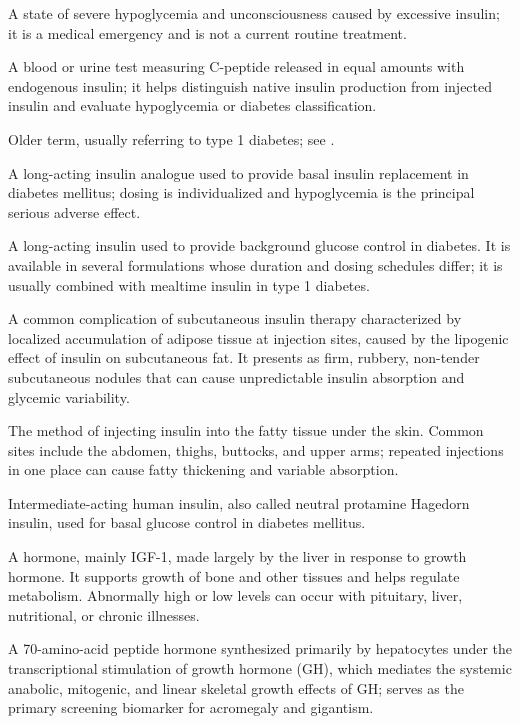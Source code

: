  A state of severe hypoglycemia and unconsciousness caused by excessive insulin; it is a medical emergency and is not a current routine treatment.

 A blood or urine test measuring C-peptide released in equal amounts with endogenous insulin; it helps distinguish native insulin production from injected insulin and evaluate hypoglycemia or diabetes classification.

 Older term, usually referring to type 1 diabetes; see .

 A long-acting insulin analogue used to provide basal insulin replacement in diabetes mellitus; dosing is individualized and hypoglycemia is the principal serious adverse effect.

 A long-acting insulin used to provide background glucose control in diabetes. It is available in several formulations whose duration and dosing schedules differ; it is usually combined with mealtime insulin in type 1 diabetes.

 A common complication of subcutaneous insulin therapy characterized by localized
accumulation of adipose tissue at injection sites, caused by the lipogenic effect of
insulin on subcutaneous fat. It presents as firm, rubbery, non-tender subcutaneous
nodules that can cause unpredictable insulin absorption and glycemic variability.

 The method of injecting insulin into the fatty tissue under the skin. Common sites include the abdomen, thighs, buttocks, and upper arms; repeated injections in one place can cause fatty thickening and variable absorption.

 Intermediate-acting human insulin, also called neutral protamine Hagedorn insulin, used for basal glucose control in diabetes mellitus.

 A hormone, mainly IGF-1, made largely by the liver in response to growth hormone. It supports growth of bone and other tissues and helps regulate metabolism. Abnormally high or low levels can occur with pituitary, liver, nutritional, or chronic illnesses.

 A 70-amino-acid peptide hormone synthesized primarily by hepatocytes under the transcriptional stimulation of growth hormone (GH), which mediates the systemic anabolic, mitogenic, and linear skeletal growth effects of GH; serves as the primary screening biomarker for acromegaly and gigantism.


